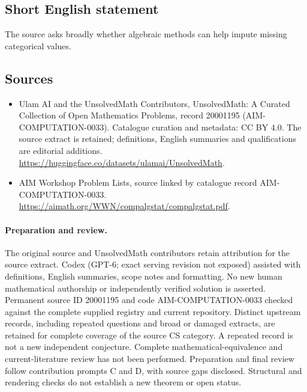 \documentclass[11pt]{article}
\begin{document}
\subsection{Short English statement}
The source asks broadly whether algebraic methods can help impute missing categorical values.
\subsection{Sources}
\begin{itemize}
\item[\hypertarget{source:20001195:1}{S1}] Ulam AI and the UnsolvedMath Contributors, UnsolvedMath: A Curated Collection of Open Mathematics Problems, record 20001195 (AIM-COMPUTATION-0033). Catalogue curation and metadata: CC BY 4.0. The source extract is retained; definitions, English summaries and qualifications are editorial additions.
\url{https://huggingface.co/datasets/ulamai/UnsolvedMath}.
\item[\hypertarget{source:20001195:2}{S2}] AIM Workshop Problem Lists, source linked by catalogue record AIM-COMPUTATION-0033.
\url{https://aimath.org/WWN/compalgstat/compalgstat.pdf}.
\end{itemize}
\paragraph{Preparation and review.}
The original source and UnsolvedMath contributors retain attribution for the source extract. Codex (GPT-6; exact serving revision not exposed) assisted with definitions, English summaries, scope notes and formatting. No new human mathematical authorship or independently verified solution is asserted. Permanent source ID 20001195 and code AIM-COMPUTATION-0033 checked against the complete supplied registry and current repository. Distinct upstream records, including repeated questions and broad or damaged extracts, are retained for complete coverage of the source CS category. A repeated record is not a new independent conjecture. Complete mathematical-equivalence and current-literature review has not been performed. Preparation and final review follow contribution prompts C and D, with source gaps disclosed. Structural and rendering checks do not establish a new theorem or open status.
\label{end:20001195}
\end{document}
